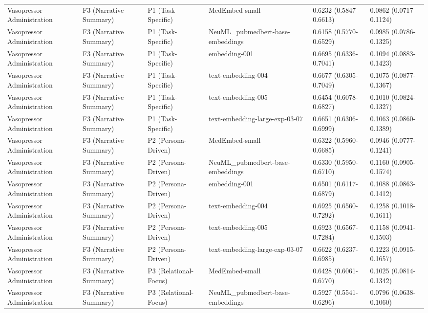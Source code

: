 \begin{tabular}{llllll}
Vasopressor Administration & F3 (Narrative Summary) & P1 (Task-Specific) & MedEmbed-small & 0.6232 (0.5847-0.6613) & 0.0862 (0.0717-0.1124) \\
Vasopressor Administration & F3 (Narrative Summary) & P1 (Task-Specific) & NeuML\_pubmedbert-base-embeddings & 0.6158 (0.5770-0.6529) & 0.0985 (0.0786-0.1325) \\
Vasopressor Administration & F3 (Narrative Summary) & P1 (Task-Specific) & embedding-001 & 0.6695 (0.6336-0.7041) & 0.1094 (0.0883-0.1423) \\
Vasopressor Administration & F3 (Narrative Summary) & P1 (Task-Specific) & text-embedding-004 & 0.6677 (0.6305-0.7049) & 0.1075 (0.0877-0.1367) \\
Vasopressor Administration & F3 (Narrative Summary) & P1 (Task-Specific) & text-embedding-005 & 0.6454 (0.6078-0.6827) & 0.1010 (0.0824-0.1327) \\
Vasopressor Administration & F3 (Narrative Summary) & P1 (Task-Specific) & text-embedding-large-exp-03-07 & 0.6651 (0.6306-0.6999) & 0.1063 (0.0860-0.1389) \\
Vasopressor Administration & F3 (Narrative Summary) & P2 (Persona-Driven) & MedEmbed-small & 0.6322 (0.5960-0.6685) & 0.0946 (0.0777-0.1241) \\
Vasopressor Administration & F3 (Narrative Summary) & P2 (Persona-Driven) & NeuML\_pubmedbert-base-embeddings & 0.6330 (0.5950-0.6710) & 0.1160 (0.0905-0.1574) \\
Vasopressor Administration & F3 (Narrative Summary) & P2 (Persona-Driven) & embedding-001 & 0.6501 (0.6117-0.6879) & 0.1088 (0.0863-0.1412) \\
Vasopressor Administration & F3 (Narrative Summary) & P2 (Persona-Driven) & text-embedding-004 & 0.6925 (0.6560-0.7292) & 0.1258 (0.1018-0.1611) \\
Vasopressor Administration & F3 (Narrative Summary) & P2 (Persona-Driven) & text-embedding-005 & 0.6923 (0.6567-0.7284) & 0.1158 (0.0941-0.1503) \\
Vasopressor Administration & F3 (Narrative Summary) & P2 (Persona-Driven) & text-embedding-large-exp-03-07 & 0.6622 (0.6237-0.6985) & 0.1223 (0.0915-0.1657) \\
Vasopressor Administration & F3 (Narrative Summary) & P3 (Relational-Focus) & MedEmbed-small & 0.6428 (0.6061-0.6770) & 0.1025 (0.0814-0.1342) \\
Vasopressor Administration & F3 (Narrative Summary) & P3 (Relational-Focus) & NeuML\_pubmedbert-base-embeddings & 0.5927 (0.5541-0.6296) & 0.0796 (0.0638-0.1060) \\

\end{tabular}
